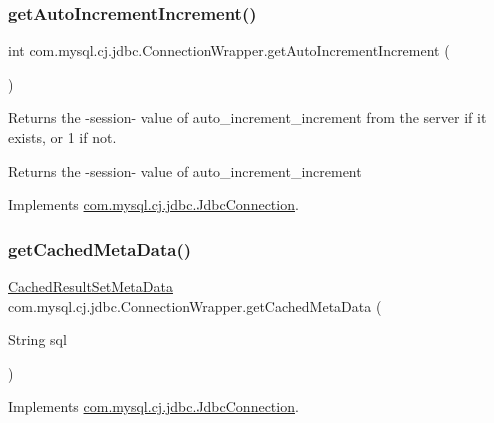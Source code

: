 \subsubsection{\texorpdfstring{get\+Auto\+Increment\+Increment()}{getAutoIncrementIncrement()}}
{\footnotesize\ttfamily int com.\+mysql.\+cj.\+jdbc.\+Connection\+Wrapper.\+get\+Auto\+Increment\+Increment (\begin{DoxyParamCaption}{ }\end{DoxyParamCaption})}

Returns the -\/session-\/ value of \textquotesingle{}auto\+\_\+increment\+\_\+increment\textquotesingle{} from the server if it exists, or \textquotesingle{}1\textquotesingle{} if not.

\begin{DoxyReturn}{Returns}
the -\/session-\/ value of \textquotesingle{}auto\+\_\+increment\+\_\+increment\textquotesingle{} 
\end{DoxyReturn}


Implements \mbox{\hyperlink{interfacecom_1_1mysql_1_1cj_1_1jdbc_1_1_jdbc_connection_a06ded1274e682178c67fdb86f09fed5a}{com.\+mysql.\+cj.\+jdbc.\+Jdbc\+Connection}}.

\mbox{\label{classcom_1_1mysql_1_1cj_1_1jdbc_1_1_connection_wrapper_ae2f849b8dfe297d894d2a4730ea538a9}} 
\subsubsection{\texorpdfstring{get\+Cached\+Meta\+Data()}{getCachedMetaData()}}
{\footnotesize\ttfamily \mbox{\hyperlink{interfacecom_1_1mysql_1_1cj_1_1jdbc_1_1result_1_1_cached_result_set_meta_data}{Cached\+Result\+Set\+Meta\+Data}} com.\+mysql.\+cj.\+jdbc.\+Connection\+Wrapper.\+get\+Cached\+Meta\+Data (\begin{DoxyParamCaption}\item[{String}]{sql }\end{DoxyParamCaption})}



Implements \mbox{\hyperlink{interfacecom_1_1mysql_1_1cj_1_1jdbc_1_1_jdbc_connection_a248df459ef314e3a79257c7bd6dc560a}{com.\+mysql.\+cj.\+jdbc.\+Jdbc\+Connection}}.

